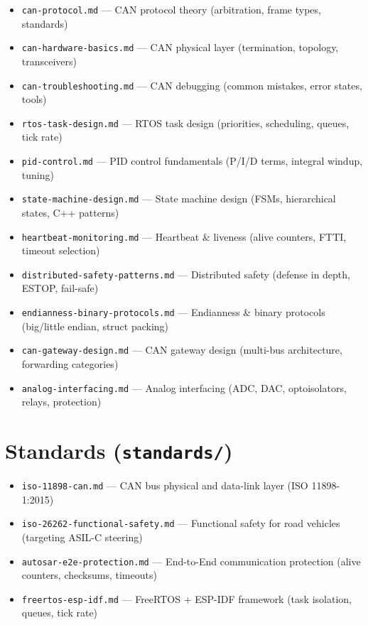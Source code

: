 \documentclass[12pt,a4paper,oneside]{report}
\begin{document}
\begin{itemize}[leftmargin=*,nosep]
  \item \texttt{can-protocol.md} --- CAN protocol theory (arbitration, frame types, standards)
  \item \texttt{can-hardware-basics.md} --- CAN physical layer (termination, topology, transceivers)
  \item \texttt{can-troubleshooting.md} --- CAN debugging (common mistakes, error states, tools)
  \item \texttt{rtos-task-design.md} --- RTOS task design (priorities, scheduling, queues, tick rate)
  \item \texttt{pid-control.md} --- PID control fundamentals (P/I/D terms, integral windup, tuning)
  \item \texttt{state-machine-design.md} --- State machine design (FSMs, hierarchical states, C++ patterns)
  \item \texttt{heartbeat-monitoring.md} --- Heartbeat \& liveness (alive counters, FTTI, timeout selection)
  \item \texttt{distributed-safety-patterns.md} --- Distributed safety (defense in depth, ESTOP, fail-safe)
  \item \texttt{endianness-binary-protocols.md} --- Endianness \& binary protocols (big/little endian, struct packing)
  \item \texttt{can-gateway-design.md} --- CAN gateway design (multi-bus architecture, forwarding categories)
  \item \texttt{analog-interfacing.md} --- Analog interfacing (ADC, DAC, optoisolators, relays, protection)
\end{itemize}

\section{Standards (\texttt{standards/})}

\begin{itemize}[leftmargin=*,nosep]
  \item \texttt{iso-11898-can.md} --- CAN bus physical and data-link layer (ISO 11898-1:2015)
  \item \texttt{iso-26262-functional-safety.md} --- Functional safety for road vehicles (targeting ASIL-C steering)
  \item \texttt{autosar-e2e-protection.md} --- End-to-End communication protection (alive counters, checksums, timeouts)
  \item \texttt{freertos-esp-idf.md} --- FreeRTOS + ESP-IDF framework (task isolation, queues, tick rate)
\end{itemize}
\end{document}

